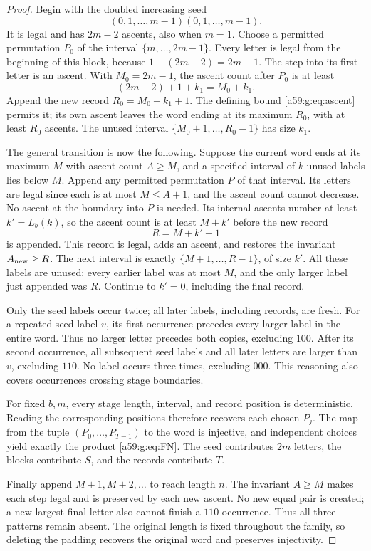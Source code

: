 \documentclass[11pt,letterpaper]{article}
\theoremstyle{remark}\newtheorem{remark}[theorem]{Remark}
\theoremstyle{remark}\newtheorem{wremark}{Remark}\renewcommand{\thewremark}{W\arabic{wremark}}
\theoremstyle{plain}\newtheorem{wcorollary}[wremark]{Corollary}
\begin{document}
\begin{proof}
Begin with the doubled increasing seed
\begin{equation}\label{a59:g:eq:seed}
 (0,1,\ldots,m-1)(0,1,\ldots,m-1).
\end{equation}
It is legal and has $2m-2$ ascents, also when $m=1$. Choose a permitted permutation $P_0$ of the interval $\{m,\ldots,2m-1\}$. Every letter is legal from the beginning of this block, because $1+(2m-2)=2m-1$. The step into its first letter is an ascent. With $M_0=2m-1$, the ascent count after $P_0$ is at least
\[
 (2m-2)+1+k_1=M_0+k_1.
\]
Append the new record $R_0=M_0+k_1+1$. The defining bound \eqref{a59:g:eq:ascent} permits it; its own ascent leaves the word ending at its maximum $R_0$, with at least $R_0$ ascents. The unused interval
$\{M_0+1,\ldots,R_0-1\}$ has size $k_1$.

The general transition is now the following. Suppose the current word ends at its maximum $M$ with ascent count $A\geq M$, and a specified interval of $k$ unused labels lies below $M$. Append any permitted permutation $P$ of that interval. Its letters are legal since each is at most $M\leq A+1$, and the ascent count cannot decrease. No ascent at the boundary into $P$ is needed. Its internal ascents number at least $k'=L_b(k)$, so the ascent count is at least $M+k'$ before the new record
\begin{equation}\label{a59:g:eq:record}
 R=M+k'+1
\end{equation}
is appended. This record is legal, adds an ascent, and restores the invariant $A_{\rm new}\geq R$. The next interval is exactly
$\{M+1,\ldots,R-1\}$, of size $k'$. All these labels are unused: every earlier label was at most $M$, and the only larger label just appended was $R$. Continue to $k'=0$, including the final record.

Only the seed labels occur twice; all later labels, including records, are fresh. For a repeated seed label $v$, its first occurrence precedes every larger label in the entire word. Thus no larger letter precedes both copies, excluding $100$. After its second occurrence, all subsequent seed labels and all later letters are larger than $v$, excluding $110$. No label occurs three times, excluding $000$. This reasoning also covers occurrences crossing stage boundaries.

For fixed $b,m$, every stage length, interval, and record position is deterministic. Reading the corresponding positions therefore recovers each chosen $P_j$. The map from the tuple $(P_0,\ldots,P_{T-1})$ to the word is injective, and independent choices yield exactly the product \eqref{a59:g:eq:FN}. The seed contributes $2m$ letters, the blocks contribute $S$, and the records contribute $T$.

Finally append $M+1,M+2,\ldots$ to reach length $n$. The invariant $A\geq M$ makes each step legal and is preserved by each new ascent. No new equal pair is created; a new largest final letter also cannot finish a $110$ occurrence. Thus all three patterns remain absent. The original length is fixed throughout the family, so deleting the padding recovers the original word and preserves injectivity.
\end{proof}
\end{document}
